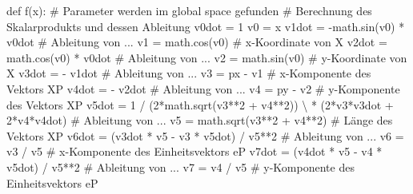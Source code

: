 \documentclass[
  letterpaper,
  DIV=11,
  oneside]{scrreprt}
\newenvironment{Shaded}{\begin{snugshade}}{\end{snugshade}}
\newcommand{\CommentTok}[1]{\textcolor[rgb]{0.37,0.37,0.37}{#1}}
\newcommand{\DecValTok}[1]{\textcolor[rgb]{0.68,0.00,0.00}{#1}}
\newcommand{\KeywordTok}[1]{\textcolor[rgb]{0.00,0.23,0.31}{#1}}
\newcommand{\NormalTok}[1]{\textcolor[rgb]{0.00,0.23,0.31}{#1}}
\newcommand{\OperatorTok}[1]{\textcolor[rgb]{0.37,0.37,0.37}{#1}}
\theoremstyle{definition}
\theoremstyle{definition}
\theoremstyle{remark}
\begin{document}
\begin{tcolorbox}
\begin{Shaded}
\begin{Highlighting}[]
\KeywordTok{def}\NormalTok{ f(x):}
    \CommentTok{\# Parameter werden im global space gefunden}
    \CommentTok{\# Berechnung des Skalarprodukts und dessen Ableitung}
\NormalTok{    v0dot }\OperatorTok{=} \DecValTok{1}
\NormalTok{    v0 }\OperatorTok{=}\NormalTok{ x}
\NormalTok{    v1dot }\OperatorTok{=} \OperatorTok{{-}}\NormalTok{math.sin(v0) }\OperatorTok{*}\NormalTok{ v0dot  }\CommentTok{\# Ableitung von ...}
\NormalTok{    v1 }\OperatorTok{=}\NormalTok{ math.cos(v0)  }\CommentTok{\# x{-}Koordinate von X}
\NormalTok{    v2dot }\OperatorTok{=}\NormalTok{ math.cos(v0) }\OperatorTok{*}\NormalTok{ v0dot   }\CommentTok{\# Ableitung von ...}
\NormalTok{    v2 }\OperatorTok{=}\NormalTok{ math.sin(v0)  }\CommentTok{\# y{-}Koordinate von X}
\NormalTok{    v3dot }\OperatorTok{=} \OperatorTok{{-}}\NormalTok{ v1dot    }\CommentTok{\# Ableitung von ...}
\NormalTok{    v3 }\OperatorTok{=}\NormalTok{ px }\OperatorTok{{-}}\NormalTok{ v1       }\CommentTok{\# x{-}Komponente des Vektors XP}
\NormalTok{    v4dot }\OperatorTok{=} \OperatorTok{{-}}\NormalTok{ v2dot    }\CommentTok{\# Ableitung von ...}
\NormalTok{    v4 }\OperatorTok{=}\NormalTok{ py }\OperatorTok{{-}}\NormalTok{ v2       }\CommentTok{\# y{-}Komponente des Vektors XP}
\NormalTok{    v5dot }\OperatorTok{=} \DecValTok{1} \OperatorTok{/}\NormalTok{ (}\DecValTok{2}\OperatorTok{*}\NormalTok{math.sqrt(v3}\OperatorTok{**}\DecValTok{2} \OperatorTok{+}\NormalTok{ v4}\OperatorTok{**}\DecValTok{2}\NormalTok{)) }\OperatorTok{\textbackslash{}}
        \OperatorTok{*}\NormalTok{ (}\DecValTok{2}\OperatorTok{*}\NormalTok{v3}\OperatorTok{*}\NormalTok{v3dot }\OperatorTok{+} \DecValTok{2}\OperatorTok{*}\NormalTok{v4}\OperatorTok{*}\NormalTok{v4dot)  }\CommentTok{\# Ableitung von ...}
\NormalTok{    v5 }\OperatorTok{=}\NormalTok{ math.sqrt(v3}\OperatorTok{**}\DecValTok{2} \OperatorTok{+}\NormalTok{ v4}\OperatorTok{**}\DecValTok{2}\NormalTok{)  }\CommentTok{\# Länge des Vektors XP}
\NormalTok{    v6dot }\OperatorTok{=}\NormalTok{ (v3dot }\OperatorTok{*}\NormalTok{ v5 }\OperatorTok{{-}}\NormalTok{ v3 }\OperatorTok{*}\NormalTok{ v5dot) }\OperatorTok{/}\NormalTok{ v5}\OperatorTok{**}\DecValTok{2}  \CommentTok{\# Ableitung von ...}
\NormalTok{    v6 }\OperatorTok{=}\NormalTok{ v3 }\OperatorTok{/}\NormalTok{ v5       }\CommentTok{\# x{-}Komponente des Einheitsvektors eP}
\NormalTok{    v7dot }\OperatorTok{=}\NormalTok{ (v4dot }\OperatorTok{*}\NormalTok{ v5 }\OperatorTok{{-}}\NormalTok{ v4 }\OperatorTok{*}\NormalTok{ v5dot) }\OperatorTok{/}\NormalTok{ v5}\OperatorTok{**}\DecValTok{2}  \CommentTok{\# Ableitung von ...}
\NormalTok{    v7 }\OperatorTok{=}\NormalTok{ v4 }\OperatorTok{/}\NormalTok{ v5       }\CommentTok{\# y{-}Komponente des Einheitsvektors eP}

\end{Highlighting}
\end{Shaded}
\end{tcolorbox}
\end{document}
